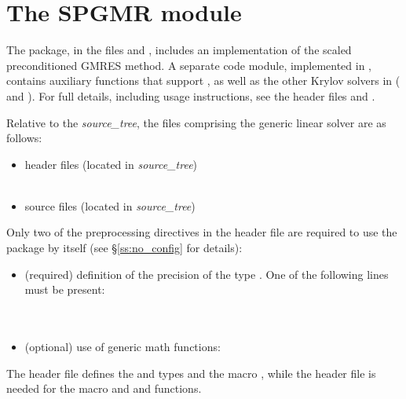 
\section{The SPGMR module}\label{ss:spgmr}

The {\spgmr} package, in the files  and , includes an
implementation of the scaled preconditioned GMRES method.  
A separate code module, implemented in , contains auxiliary
functions that support {\spgmr}, as well as the other Krylov solvers in {\sundials}
({\spbcg} and {\sptfqmr}).
For full details, including usage instructions, see the header
files  and .

Relative to the {\sundials} {\em source\_tree}, the files comprising the
{\spgmr} generic linear solver are as follows:
\begin{itemize}
\item header files (located in {\em source\_tree})\\
     \\
     
\item source files (located in {\em source\_tree})\\
    
\end{itemize}
Only two of the preprocessing directives in the header file  
are required to use the {\spgmr} package by itself (see \S\ref{ss:no_config} for details):
\begin{itemize}
\item (required) definition of the precision of the {\sundials} type . 
  One of the following lines must be present:\\
  \\
  \\
\item (optional) use of generic math functions:\\
\end{itemize}
The  header file defines the {\sundials}
 and  types and the macro , while the 
 header file is needed for the  macro
and  and  functions.

